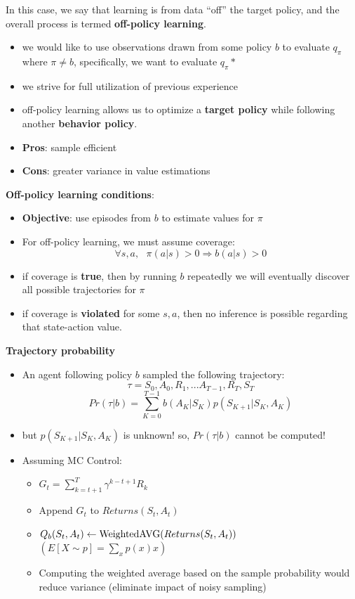 In this case, we say that learning is from data “off” the target policy, and the overall process is termed \textbf{off-policy learning}.


\begin{itemize}
    \item we would like to use observations drawn from some policy $b$ to evaluate $q_\pi$ where $\pi \neq b$, specifically, we want to evaluate $q_\pi *$
    \item we strive for full utilization of previous experience
    \item off-policy learning allows us to optimize a \textbf{target policy} while following another \textbf{behavior policy}.
    \item \textbf{Pros}: sample efficient
    \item \textbf{Cons}: greater variance in value estimations
\end{itemize}

\vspace{0.3cm}
\textbf{Off-policy learning conditions}:
\begin{itemize}
    \item \textbf{Objective}: use episodes from $b$ to estimate values for $\pi$
    \item For off-policy learning, we must assume coverage:
    \[
        \forall s,a, \text{ } \pi(a|s)>0 \Rightarrow b(a|s) > 0
    \]
    \item if coverage is \textbf{true}, then by running $b$ repeatedly we will eventually discover all possible trajectories for $\pi$
    \item if coverage is \textbf{violated} for some $s,a$, then no inference is possible regarding that state-action value.
\end{itemize}

\vspace{0.3cm}
\textbf{Trajectory probability}
\begin{itemize}
    \item An agent following policy $b$ sampled the following trajectory:
    \[
        \tau = {S_0,A_0,R_1,...A_{T-1},R_T,S_T}
    \]
    \[
        Pr(\tau|b) = \displaystyle\sum_{K=0}^{T-1} b(A_K|S_K)p(S_{K+1}|S_K,A_K) 
    \]
    \item but $p(S_{K+1}|S_K,A_K)$ is unknown! so, $Pr(\tau|b)$ cannot be computed!
    \item Assuming MC Control:
    \begin{itemize}
        \item \(G_t = \displaystyle\sum_{k=t+1}^{T} \gamma^{k-t+1}R_k\)
        \item Append $G_t$ to $Returns(S_t,A_t)$
        \item $Q_b(S_t,A_t) \leftarrow \operatorname{WeightedAVG}(Returns(S_t,A_t))$ \hfill \( \left( \displaystyle E[X \sim p] = \sum_x p(x)x \right) \)
        \item Computing the weighted average based on the sample probability would reduce variance (eliminate impact of noisy sampling)
    \end{itemize}
    
\end{itemize}


